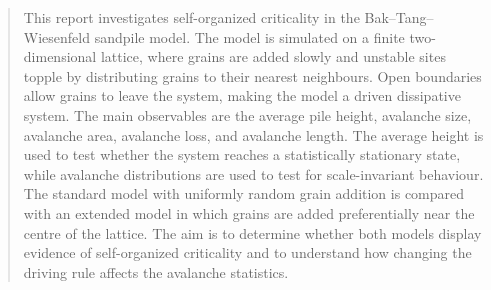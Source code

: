 \documentclass[a4paper, 10.5pt, oneside]{report} %
\begin{document}


\begin{abstract}
This report investigates self-organized criticality in the Bak--Tang--Wiesenfeld sandpile model. The model is simulated on a finite two-dimensional lattice, where grains are added slowly and unstable sites topple by distributing grains to their nearest neighbours. Open boundaries allow grains to leave the system, making the model a driven dissipative system. The main observables are the average pile height, avalanche size, avalanche area, avalanche loss, and avalanche length. The average height is used to test whether the system reaches a statistically stationary state, while avalanche distributions are used to test for scale-invariant behaviour. The standard model with uniformly random grain addition is compared with an extended model in which grains are added preferentially near the centre of the lattice. The aim is to determine whether both models display evidence of self-organized criticality and to understand how changing the driving rule affects the avalanche statistics.
\end{abstract}

\tableofcontents





\begin{appendices}
 
\end{appendices}



\end{document}
